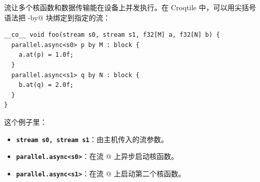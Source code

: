 流让多个核函数和数据传输能在设备上并发执行。在 Croqtile 中，可以用尖括号语法把 \co@parallel-by@ 块绑定到指定的流：

\begin{lstlisting}[language=croqtile,caption={流绑定}]
__co__ void foo(stream s0, stream s1, f32[M] a, f32[N] b) {
  parallel.async<s0> p by M : block {
    a.at(p) = 1.0f;
  }
  parallel.async<s1> q by N : block {
    b.at(q) = 2.0f;
  }
}
\end{lstlisting}

这个例子里：

\begin{itemize}[leftmargin=1.6em]
\item \textbf{\texttt{stream s0, stream s1}}：由主机传入的流参数。
\item \textbf{\texttt{parallel.async\textless{}s0\textgreater{}}}：在流 @ 上异步启动核函数。
\item \textbf{\texttt{parallel.async\textless{}s1\textgreater{}}}：在流 @ 上启动第二个核函数。
\end{itemize}
